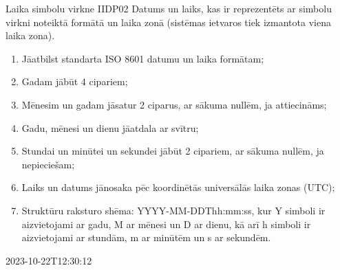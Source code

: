 \parameterTable
{Laika simbolu virkne}
{IIDP02}
{
	Datums un laiks, kas ir reprezentēts ar simbolu virkni noteiktā formātā un laika zonā (sistēmas ietvaros tiek izmantota viena laika zona).
}
{
	\begin{enumerate}
		\item Jāatbilst standarta ISO 8601 datumu un laika formātam;
		\item Gadam jābūt 4 cipariem;
		\item Mēnesim un gadam jāsatur 2 ciparus, ar sākuma nullēm, ja attiecināms;
		\item Gadu, mēnesi un dienu jāatdala ar svītru;
		\item Stundai un minūtei un sekundei jābūt 2 cipariem, ar sākuma nullēm, ja nepieciešam;
		\item Laiks un datums jānosaka pēc koordinētās universālās laika zonas (UTC);
		\item Struktūru raksturo shēma: YYYY-MM-DDThh:mm:ss, kur Y simboli ir aizvietojami ar gadu, M ar mēnesi un D ar dienu, kā arī h simboli ir aizvietojami ar stundām, m ar minūtēm un s ar sekundēm.
	\end{enumerate}
}
{
	2023-10-22T12:30:12
}
